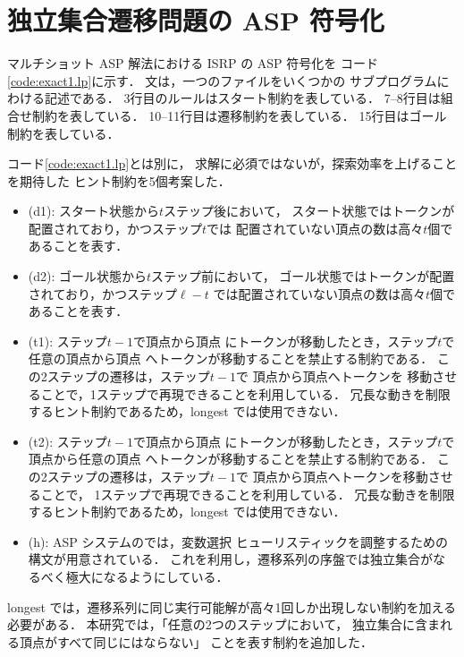 \section{独立集合遷移問題の ASP 符号化}\label{sec:proposal}

 

マルチショット ASP 解法における ISRP の ASP 符号化を
コード\ref{code:exact1.lp}に示す．
文は，一つのファイルをいくつかの
サブプログラムにわける記述である．
3行目のルールはスタート制約を表している．
7--8行目は組合せ制約を表している．
10--11行目は遷移制約を表している．
15行目はゴール制約を表している．

コード\ref{code:exact1.lp}とは別に，
求解に必須ではないが，探索効率を上げることを期待した
ヒント制約を5個考案した．
\begin{itemize}
  \item {} (d1): スタート状態から$t$ステップ後において，
    スタート状態ではトークンが配置されており，かつステップ$t$では
    配置されていない頂点の数は高々$t$個であることを表す．
  \item {} (d2): ゴール状態から$t$ステップ前において，
    ゴール状態ではトークンが配置されており，かつステップ$\ell-t$
    では配置されていない頂点の数は高々$t$個であることを表す．
  \item {} (t1): ステップ$t-1$で頂点から頂点
    にトークンが移動したとき，ステップ$t$で任意の頂点から頂点
    へトークンが移動することを禁止する制約である．
    この2ステップの遷移は，ステップ$t-1$で
    頂点から頂点へトークンを
    移動させることで，1ステップで再現できることを利用している．
    冗長な動きを制限するヒント制約であるため，longest では使用できない．
  \item {} (t2): ステップ$t-1$で頂点から頂点
    にトークンが移動したとき，ステップ$t$で頂点から任意の頂点
    へトークンが移動することを禁止する制約である．
    この2ステップの遷移は，ステップ$t-1$で
    頂点から頂点へトークンを移動させることで，
    1ステップで再現できることを利用している．
    冗長な動きを制限するヒント制約であるため，longest では使用できない．
  \item {} (h): ASP システムの{\clingo}では，変数選択
    ヒューリスティックを調整するための構文が用意されている．
    これを利用し，遷移系列の序盤では独立集合がなるべく極大になるようにしている．
\end{itemize}

longest では，遷移系列に同じ実行可能解が高々1回しか出現しない制約を加える
必要がある．
本研究では，「任意の2つのステップにおいて，
独立集合に含まれる頂点がすべて同じにはならない」
ことを表す制約を追加した．
